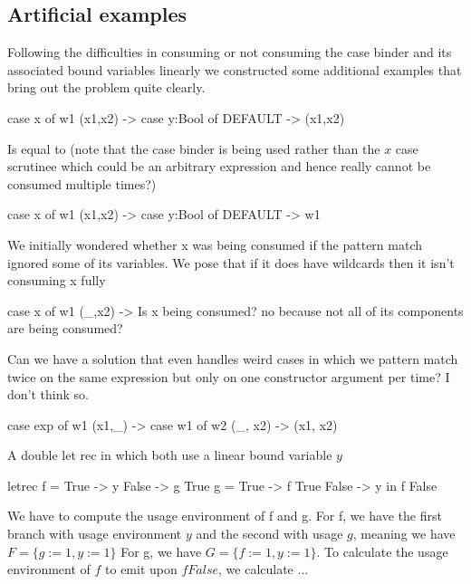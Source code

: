 \documentclass[]{lwnovathesis}
\begin{document}


\subsection{Artificial examples}

Following the difficulties in consuming or not consuming the case binder and its
associated bound variables linearly we constructed some additional examples that
bring out the problem quite clearly.
\begin{code}
case x of w1
    (x1,x2) -> case y:Bool of
                DEFAULT -> (x1,x2)
\end{code}
Is equal to (note that the case binder is being used rather than the $x$ case
scrutinee which could be an arbitrary expression and hence really cannot be
consumed multiple times?)
\begin{code}
case x of w1
    (x1,x2) -> case y:Bool of
                DEFAULT -> w1
\end{code}

We initially wondered whether x was being consumed if the pattern match ignored
some of its variables. We pose that if it does have wildcards then it isn't
consuming x fully
\begin{code}
case x of w1
    (_,x2) -> Is x being consumed? no because not all of its components are
    being consumed?
\end{code}

Can we have a solution that even handles weird cases in which we pattern match
twice on the same expression but only on one constructor argument per time? I
don't think so.
\begin{code}
case exp of w1
    (x1,_) -> case w1 of w2
                (_, x2) -> (x1, x2)
\end{code}

A double let rec in which both use a linear bound variable $y$
\begin{code}
letrec f = \case
        True  -> y
        False -> g True
       g = \case
        True -> f True
        False -> y
    in f False
\end{code}

We have to compute the usage environment of f and g.
For f, we have the first branch with usage environment $y$ and the second with
usage $g$, meaning we have $F = \{g := 1, y := 1\}$
For g, we have $G = \{f := 1, y := 1\}$. To calculate the usage environment of
$f$ to emit upon $f False$, we calculate ...
\end{document}
